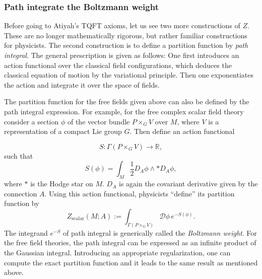 \subsubsection*{Path integrate the Boltzmann weight}

Before going to Atiyah's TQFT axioms, let us see two more constructions
of $Z$. These are no longer mathematically rigorous, but rather familiar
constructions for physicists. The second construction is to define
a partition function by \emph{path integral}. The general prescription
is given as follows: One first introduces an action functional over
the classical field configurations, which deduces the classical equation
of motion by the variational principle. Then one exponentiates the
action and integrate it over the space of fields. 

The partition function for the free fields given above can also be
defined by the path integral expression. For example, for the free
complex scalar field theory consider a section $\phi$ of the vector
bundle $P\times_{G}V$ over $M$, where $V$ is a representation of
a compact Lie group $G$. Then define an action functional 

\begin{equation}
  S  :  \Gamma\left(P\times_{G}V\right)  \longrightarrow  \mathbb{R},
\end{equation}
 such that
\begin{equation}
  S\left(\phi\right)  =  \int_{M}\frac{1}{2}D_{A}\phi\wedge\ast D_{A}\phi,
\end{equation}
 where $*$ is the Hodge star on $M$. $D_{A}$ is again the covariant
derivative given by the connection $A$. Using this action functional,
physicists ``define'' its partition function by 
\begin{equation}
Z_{\mathrm{scalar}}\left(M;A\right):=\int_{\Gamma\left(P\times_{G}V\right)}\mathcal{D}\phi\,e^{-S\left(\phi\right)}.
\end{equation}
The integrand $e^{-S}$ of path integral is generically called the
\emph{Boltzmann weight}. For the free field theories, the path integral
can be expressed as an infinite product of the Gaussian integral.
Introducing an appropriate regularization, one can compute the exact
partition function and it leads to the same result as mentioned above. 

